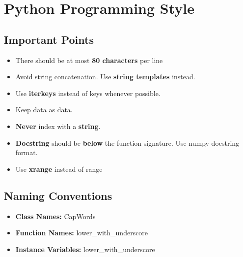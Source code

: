 \documentclass{article}
\begin{document}
\section*{Python Programming Style }

\subsection*{Important Points}
\begin{itemize}
  \item There should be at most \textbf{80 characters} per line
  \item Avoid string concatenation. Use \textbf{string templates} instead.
  \item Use \textbf{iterkeys} instead of keys whenever possible.
  \item Keep data as data.
  \item \textbf{Never} index with a \textbf{string}.
  \item \textbf{Docstring} should be \textbf{below} the function signature. Use
  numpy docstring format. 
  \item Use \textbf{xrange} instead of range
\end{itemize}


\subsection*{Naming Conventions}
\begin{itemize}
  \item \textbf{Class Names:} CapWords
  \item \textbf{Function Names:} lower\_with\_underscore
  \item \textbf{Instance Variables:} lower\_with\_underscore 
\end{itemize}
\end{document}
